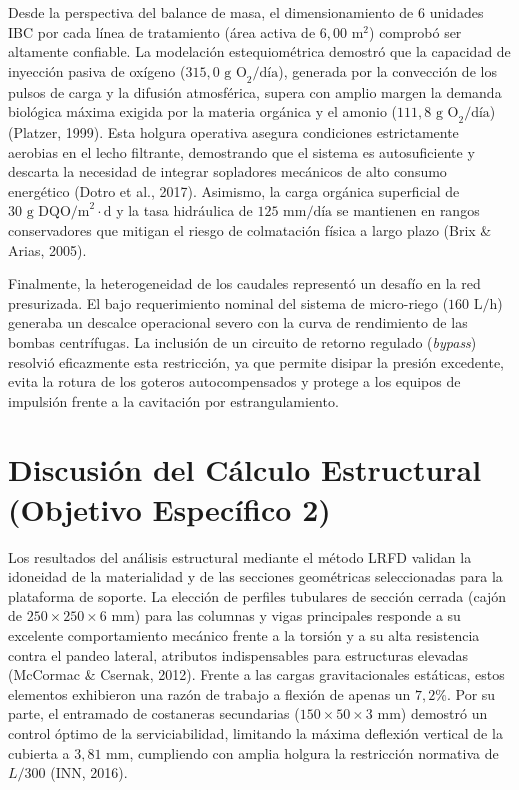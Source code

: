 \documentclass[12pt, letterpaper]{report}
\begin{document}
Desde la perspectiva del balance de masa, el dimensionamiento de 6 unidades IBC por cada línea de tratamiento (área activa de $6,00\text{ m}^2$) comprobó ser altamente confiable. La modelación estequiométrica demostró que la capacidad de inyección pasiva de oxígeno ($315,0\text{ g O}_2/\text{día}$), generada por la convección de los pulsos de carga y la difusión atmosférica, supera con amplio margen la demanda biológica máxima exigida por la materia orgánica y el amonio ($111,8\text{ g O}_2/\text{día}$) (Platzer, 1999). Esta holgura operativa asegura condiciones estrictamente aerobias en el lecho filtrante, demostrando que el sistema es autosuficiente y descarta la necesidad de integrar sopladores mecánicos de alto consumo energético (Dotro et al., 2017). Asimismo, la carga orgánica superficial de $30\text{ g DQO/m}^2\cdot\text{d}$ y la tasa hidráulica de $125\text{ mm/día}$ se mantienen en rangos conservadores que mitigan el riesgo de colmatación física a largo plazo (Brix \& Arias, 2005).

Finalmente, la heterogeneidad de los caudales representó un desafío en la red presurizada. El bajo requerimiento nominal del sistema de micro-riego ($160\text{ L/h}$) generaba un descalce operacional severo con la curva de rendimiento de las bombas centrífugas. La inclusión de un circuito de retorno regulado (\textit{bypass}) resolvió eficazmente esta restricción, ya que permite disipar la presión excedente, evita la rotura de los goteros autocompensados y protege a los equipos de impulsión frente a la cavitación por estrangulamiento.

\section{Discusión del Cálculo Estructural (Objetivo Específico 2)}
Los resultados del análisis estructural mediante el método LRFD validan la idoneidad de la materialidad y de las secciones geométricas seleccionadas para la plataforma de soporte. La elección de perfiles tubulares de sección cerrada (cajón de $250 \times 250 \times 6\text{ mm}$) para las columnas y vigas principales responde a su excelente comportamiento mecánico frente a la torsión y a su alta resistencia contra el pandeo lateral, atributos indispensables para estructuras elevadas (McCormac \& Csernak, 2012). Frente a las cargas gravitacionales estáticas, estos elementos exhibieron una razón de trabajo a flexión de apenas un $7,2\%$. Por su parte, el entramado de costaneras secundarias ($150 \times 50 \times 3\text{ mm}$) demostró un control óptimo de la serviciabilidad, limitando la máxima deflexión vertical de la cubierta a $3,81\text{ mm}$, cumpliendo con amplia holgura la restricción normativa de $L/300$ (INN, 2016).
\end{document}
